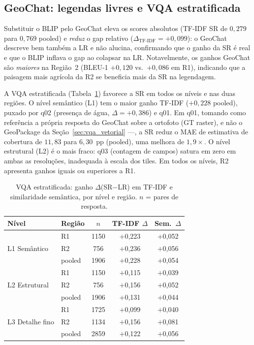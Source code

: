 \documentclass[12pt]{article}
\begin{document}
\subsection{GeoChat: legendas livres e VQA estratificada}

Substituir o BLIP pelo GeoChat eleva os scores absolutos (TF-IDF SR de
$0{,}279$ para $0{,}769$ pooled) e \emph{reduz} o gap relativo
($\Delta_{\text{TF-IDF}}=+0{,}099$): o GeoChat descreve bem também a LR e
não alucina, confirmando que o ganho da SR é real e que o BLIP inflava o
gap ao colapsar na LR. Notavelmente, os ganhos GeoChat são \emph{maiores}
na Região~2 (BLEU-1 $+0{,}120$ vs.\ $+0{,}086$ em R1), indicando que a
paisagem mais agrícola da R2 se beneficia mais da SR na legendagem.

A VQA estratificada (Tabela~\ref{tab:vqa_nivel}) favorece a SR em todos os
níveis e nas duas regiões. O nível semântico (L1) tem o maior ganho
TF-IDF ($+0{,}228$ pooled), puxado por q02 (presença de água,
$\Delta=+0{,}386$) e q01. Em q01, tomando como referência a própria
resposta do GeoChat sobre a ortofoto (GT raster), e não o GeoPackage da
Seção~\ref{sec:vqa_vetorial} ---, a SR reduz o MAE de estimativa de
cobertura de $11{,}83$ para $6{,}30$~pp (pooled), uma melhora de
$1{,}9\times$. O nível estrutural (L2) é o mais fraco: q03 (contagem de
campos) satura em zero em ambas as resoluções, inadequada à escala dos
tiles. Em todos os níveis, R2 apresenta ganhos iguais ou superiores a R1.

\begin{table}[ht]
\centering
\caption{VQA estratificada: ganho $\Delta$(SR$-$LR) em TF-IDF e
  similaridade semântica, por nível e região. $n$ = pares de resposta.}
\label{tab:vqa_nivel}
\small
\begin{tabular}{llccc}
\toprule
\textbf{Nível} & \textbf{Região} & \textbf{$n$} & \textbf{TF-IDF $\Delta$} & \textbf{Sem.\ $\Delta$} \\
\midrule
\multirow{3}{*}{L1 Semântico}
  & R1 & 1150 & $+$0{,}223 & $+$0{,}052 \\
  & R2 &  756 & $+$0{,}236 & $+$0{,}056 \\
  & pooled & 1906 & $+$0{,}228 & $+$0{,}054 \\
\midrule
\multirow{3}{*}{L2 Estrutural}
  & R1 & 1150 & $+$0{,}115 & $+$0{,}039 \\
  & R2 &  756 & $+$0{,}156 & $+$0{,}052 \\
  & pooled & 1906 & $+$0{,}131 & $+$0{,}044 \\
\midrule
\multirow{3}{*}{L3 Detalhe fino}
  & R1 & 1725 & $+$0{,}099 & $+$0{,}040 \\
  & R2 & 1134 & $+$0{,}156 & $+$0{,}081 \\
  & pooled & 2859 & $+$0{,}122 & $+$0{,}056 \\
\bottomrule
\end{tabular}
\end{table}
\end{document}
